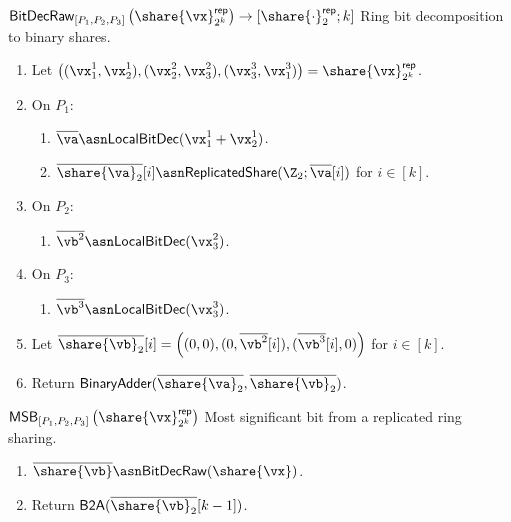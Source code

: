 
\msubsubsection
  {$\mathsf{BitDecRaw}_{[P_1, P_2, P_3]} \left( \share{\vx}^\mathsf{rep}_{2^k} \right) \rightarrow [\share{\cdot}^\mathsf{rep}_2; k]$}
  Ring bit decomposition to binary shares.

  \begin{enumerate}
  \item Let $\left( (\vx_1^1, \vx_2^1), (\vx_2^2, \vx_3^2), (\vx_3^3, \vx_1^3) \right) = \share{\vx}^{\mathsf{rep}}_{2^k}$.

  \item On $P_1$:
  \begin{enumerate}
    \item $\overline{\va} \asn \textsf{LocalBitDec}(\vx^1_1 + \vx^1_2)$.
    \item $\overline{\share{\va}_2}[i] \asn \mathsf{ReplicatedShare}(\Z_2; \overline{\va}[i])$ for $i \in [k]$.
  \end{enumerate}

  \item On $P_2$:
  \begin{enumerate}
      \item $\overline{\vb^2} \asn \textsf{LocalBitDec}(\vx_3^2)$.
  \end{enumerate}

  \item On $P_3$:
  \begin{enumerate}
      \item $\overline{\vb^3} \asn \textsf{LocalBitDec}(\vx_3^3)$.
  \end{enumerate}
  \item Let $\overline{\share{\vb}_2}[i] = \left( (0, 0), (0, \overline{\vb^2}[i]), (\overline{\vb^3}[i], 0) \right)$ for $i \in [k]$.
  \item Return $\textsf{BinaryAdder}(\overline{\share{\va}_2}, \overline{\share{\vb}_2})$.
\end{enumerate}

\msubsubsection
  {$\mathsf{MSB}_{[P_1, P_2, P_3]} \left( \share{\vx}^\mathsf{rep}_{2^k} \right)$}
  \label{fig:msb-protocol}
  Most significant bit from a replicated ring sharing.

  \begin{enumerate}
  \item $\overline{\share{\vb}} \asn \mathsf{BitDecRaw}(\share{\vx})$.
  \item Return $\textsf{B2A}(\overline{\share{\vb}_2}[k-1])$.
  \end{enumerate}
